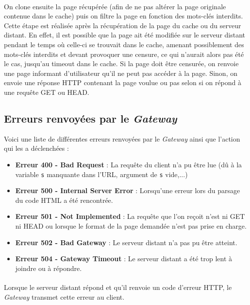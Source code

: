 \documentclass[a4paper,11pt]{article}
\begin{document}
\paragraph{}

On clone ensuite la page récupérée (afin de ne pas altérer la page originale contenue dans le cache) puis on filtre la page en fonction des mots-clés interdits. Cette étape est réalisée après la récupération de la page du cache ou du serveur distant. En effet, il est possible que la page ait été modifiée sur le serveur distant pendant le temps où celle-ci se trouvait dans le cache, amenant possiblement des mots-clés interdits et devant provoquer une censure, ce qui n'aurait alors pas été le cas, jusqu'au timeout dans le cache. Si la page doit être censurée, on renvoie une page informant d'utilisateur qu'il ne peut pas accéder à la page. Sinon, on envoie une réponse HTTP contenant la page voulue ou pas selon si on répond à une requête GET ou HEAD.



	\subsection{Erreurs renvoyées par le \textit{Gateway}}
Voici une liste de différentes erreurs renvoyées par le \textit{Gateway} ainsi que l'action qui les a déclenchées : 
\begin{itemize}
	\setlength{\itemsep}{6pt}
	\item \textbf{Erreur 400 - Bad Request} : La requête du client n'a pu être lue (dû à la variable \texttt{s} manquante dans l'URL, argument de \texttt{s} vide,...)
	\item \textbf{Erreur 500 - Internal Server Error} : Lorsqu'une erreur lors du parsage du code HTML a été rencontrée.
	\item \textbf{Erreur 501 - Not Implemented} : La requête que l'on reçoit n'est ni GET ni HEAD ou lorsque le format de la page demandée n'est pas prise en charge.
	\item \textbf{Erreur 502 - Bad Gateway} : Le serveur distant n'a pas pu être atteint.
	\item \textbf{Erreur 504 - Gateway Timeout} : Le serveur distant a été trop lent à joindre ou à répondre.
\end{itemize}
\paragraph{}
Lorsque le serveur distant répond et qu'il renvoie un code d'erreur HTTP, le \textit{Gateway} transmet cette erreur au client.
\end{document}

